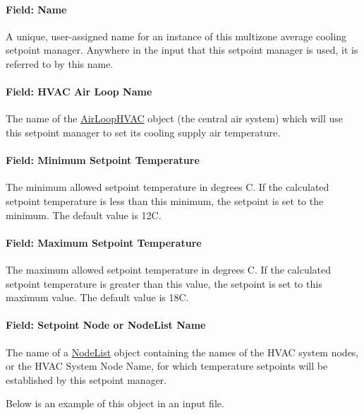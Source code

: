 \paragraph{Field: Name}\label{field-name-14-008}

A unique, user-assigned name for an instance of this multizone average cooling setpoint manager. Anywhere in the input that this setpoint manager is used, it is referred to by this name.

\paragraph{Field: HVAC Air Loop Name}\label{field-hvac-air-loop-name-4}

The name of the \hyperref[airloophvac]{AirLoopHVAC} object (the central air system) which will use this setpoint manager to set its cooling supply air temperature.

\paragraph{Field: Minimum Setpoint Temperature}\label{field-minimum-setpoint-temperature-4}

The minimum allowed setpoint temperature in degrees C. If the calculated setpoint temperature is less than this minimum, the setpoint is set to the minimum. The default value is 12C.

\paragraph{Field: Maximum Setpoint Temperature}\label{field-maximum-setpoint-temperature-4}

The maximum allowed setpoint temperature in degrees C. If the calculated setpoint temperature is greater than this value, the setpoint is set to this maximum value. The default value is 18C.

\paragraph{Field: Setpoint Node or NodeList Name}\label{field-setpoint-node-or-nodelist-name-13}

The name of a \hyperref[nodelist]{NodeList} object containing the names of the HVAC system nodes, or the HVAC System Node Name, for which temperature setpoints will be established by this setpoint manager.

Below is an example of this object in an input file.

